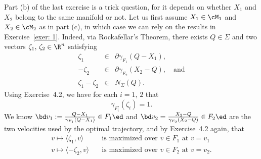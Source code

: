 \documentclass[12pt]{article}
\begin{document}
Part (b) of the last exercise is a trick question, for it depends on whether $X_1$ and $X_2$ belong to the same manifold or not.  Let us first assume $X_1\in\cM_1$ and $X_2\in\cM_2$ as in part (c), in which case we can rely on the results in Exercise~\ref{exer: 1}.  Indeed, via Rockafellar's Theorem, there exists $Q\in\Sigma$ and two vectors $\zeta_1,\,\zeta_2\in\R^n$ satisfying
\begin{eqnarray}
\zeta_1&\in &\partial\gamma_{F_1}(Q-X_1),  \label{eq: zeta1}\\
 -\zeta_2&\in &\partial\gamma_{F_2}(X_2-Q),\quad\text{and}  \label{eq: zeta2}\\
\zeta_1-\zeta_2 &\in & N_{\Sigma}(Q).  \label{eq: normal}
\end{eqnarray}
Using Exercise~4.2, we have for each $i=1,\,2$ that
\begin{equation}\label{eq: polar = 1}
\gamma_{F_i^{\circ}}(\zeta_i)=1 .
\end{equation}
We know $\bd v_1:=\frac{Q-X_1}{\gamma_{F_1}(Q-X_1)}\in F_1\ed$ and $\bd v_2=\frac{X_2-Q}{\gamma_{F_2}(X_2-Q)}\in F_2\ed$ are the two velocities used by the optimal trajectory, and by Exercise~4.2 again, that
\begin{align}
v\mapsto \langle\zeta_1,v\rangle\quad &\text{is maximized over }v\in F_1\text{ at } v=v_1 \label{eq: MP1}\\
v\mapsto \langle-\zeta_2,v\rangle\quad &\text{is maximized over }v\in F_2\text{ at } v=v_2. \label{eq: MP2}
\end{align}
\end{document}
